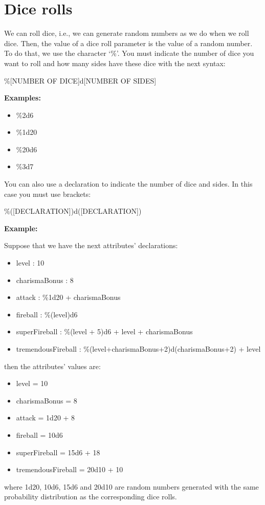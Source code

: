 \documentclass[11pt,a4paper,openright,oneside]{book}
\newenvironment{exs}
{
  \setlength{\parindent}{0cm}
  \large \textbf{Examples:} \normalsize
}
{}
\newenvironment{ex}
{
  \setlength{\parindent}{0cm}
  \large \textbf{Example:} \normalsize 
}
{}
\begin{document}
\section{Dice rolls}
  We can roll dice, i.e., we can generate random numbers as we do when we roll dice. Then, the value of a dice roll parameter is the value of a random number. To do that, we use the character `\textsf{\%}'. You must indicate the number of dice you want to roll and how many sides have these dice with the next syntax:

\begin{center} \textsf{\%\textsc{\scriptsize[NUMBER OF DICE]}d\textsc{\scriptsize[NUMBER OF SIDES]}} \end{center}

\begin{exs}
\begin{itemize}
  \item \textsf{\%2d6}
  \item \textsf{\%1d20}
  \item \textsf{\%20d6}
  \item \textsf{\%3d7}
\end{itemize}
\end{exs}

You can also use a declaration to indicate the number of dice and sides. In this case you must use brackets:

\begin{center} \textsf{\%(\textsc{\scriptsize[DECLARATION]})d(\textsc{\scriptsize[DECLARATION]})} \end{center}

\begin{ex}
Suppose that we have the next attributes' declarations:
\begin{itemize}
  \item \textsf{level : 10}
  \item \textsf{charismaBonus : 8 }
  \item \textsf{attack : \%1d20 + charismaBonus}
  \item \textsf{fireball : \%(level)d6}
  \item \textsf{superFireball : \%(level + 5)d6 + level + charismaBonus}
  \item \textsf{tremendousFireball : \%(level+charismaBonus+2)d(charismaBonus+2) + level}
\end{itemize}
then the attributes' values are:
\begin{itemize}
  \item \textsf{level = 10}
  \item \textsf{charismaBonus = 8 }
  \item \textsf{attack = 1d20 + 8}
  \item \textsf{fireball = 10d6}
  \item \textsf{superFireball = 15d6 + 18}
  \item \textsf{tremendousFireball = 20d10 + 10}
\end{itemize}
where \textsf{1d20, 10d6, 15d6} and \textsf{20d10} are random numbers generated with the same probability distribution as the corresponding dice rolls.
\end{ex}
\end{document}
